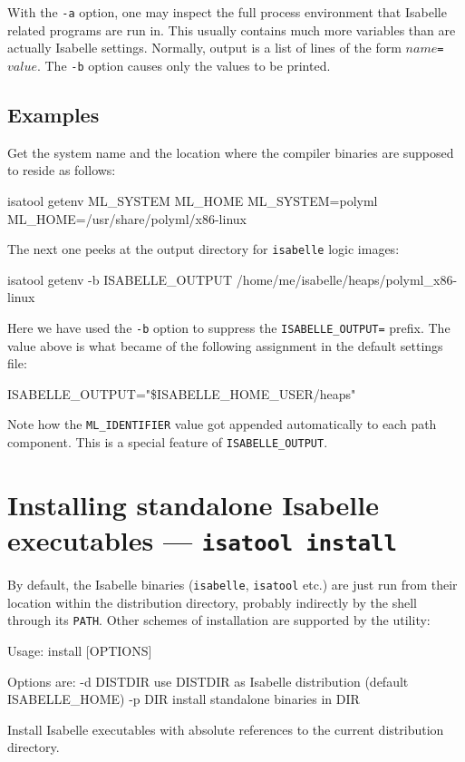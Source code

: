 With the \texttt{-a} option, one may inspect the full process environment that
Isabelle related programs are run in. This usually contains much more
variables than are actually Isabelle settings.  Normally, output is a list of
lines of the form \mbox{$name$\texttt{=}$value$}. The \texttt{-b} option
causes only the values to be printed.


\subsection*{Examples}

Get the {\ML} system name and the location where the compiler binaries are
supposed to reside as follows:
\begin{ttbox}
isatool getenv ML_SYSTEM ML_HOME
{\out ML_SYSTEM=polyml}
{\out ML_HOME=/usr/share/polyml/x86-linux}
\end{ttbox}

The next one peeks at the output directory for \texttt{isabelle} logic images:
\begin{ttbox}
isatool getenv -b ISABELLE_OUTPUT
{\out /home/me/isabelle/heaps/polyml_x86-linux}
\end{ttbox}
Here we have used the \texttt{-b} option to suppress the
\texttt{ISABELLE_OUTPUT=} prefix.  The value above is what became of the
following assignment in the default settings file:
\begin{ttbox}
ISABELLE_OUTPUT="\$ISABELLE_HOME_USER/heaps"
\end{ttbox}
Note how the \texttt{ML_IDENTIFIER} value got appended automatically to each
path component. This is a special feature of \texttt{ISABELLE_OUTPUT}.


\section{Installing standalone Isabelle executables --- \texttt{isatool install}}
\label{sec:tool-install}

By default, the Isabelle binaries (\texttt{isabelle}, \texttt{isatool} etc.)
are just run from their location within the distribution directory, probably
indirectly by the shell through its \texttt{PATH}.  Other schemes of
installation are supported by the  utility:
\begin{ttbox}
Usage: install [OPTIONS]

  Options are:
    -d DISTDIR   use DISTDIR as Isabelle distribution
                 (default ISABELLE_HOME)
    -p DIR       install standalone binaries in DIR

  Install Isabelle executables with absolute references to the current
  distribution directory.
\end{ttbox}

